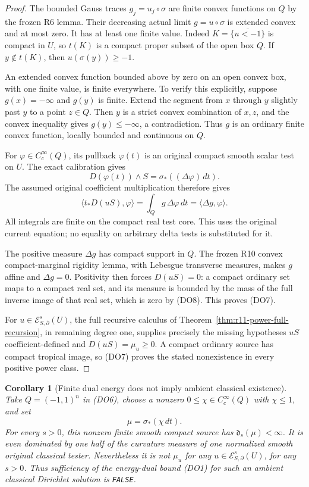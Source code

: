 \documentclass[11pt,a4paper]{article}
\numberwithin{equation}{section}
\newtheorem{corollary}[theorem]{Corollary}
\theoremstyle{definition}
\theoremstyle{remark}
\begin{document}
\begin{proof}
The bounded Gauss traces $g_j=u_j\circ\sigma$ are finite convex
functions on $Q$ by the frozen R6 lemma. Their decreasing actual
limit $g=u\circ\sigma$ is extended convex and at most zero.
It has at least one finite value. Indeed
$K=\overline{\{u<-1\}}$ is compact in $U$, so $t(K)$ is
a compact proper subset of the open box $Q$. If $y\notin t(K)$,
then $u(\sigma(y))\geq-1$.

An extended convex function bounded above by zero on an open
convex box, with one finite value, is finite everywhere. To
verify this explicitly, suppose $g(x)=-\infty$ and $g(y)$ is
finite. Extend the segment from $x$ through $y$ slightly past
$y$ to a point $z\in Q$. Then $y$ is a strict convex
combination of $x,z$, and the convex inequality gives
$g(y)\leq-\infty$, a contradiction. Thus $g$ is an ordinary
finite convex function, locally bounded and continuous on $Q$.

For $\varphi\in C_c^\infty(Q)$, its pullback $\varphi(t)$
is an original compact smooth scalar test on $U$. The exact
calibration gives
\[
              D(\varphi(t))\wedge S
                         =\sigma_*((\Delta\varphi)\,dt).
\]
The assumed original coefficient multiplication therefore gives
\[
 \bigl\langle t_*D(uS),\varphi\bigr\rangle
      =\int_Q g\,\Delta\varphi\,dt
      =\langle\Delta g,\varphi\rangle.
 \tag{DO8}
\]
All integrals are finite on the compact real test core. This
uses the original current equation; no equality on arbitrary
delta tests is substituted for it.

The positive measure $\Delta g$ has compact support in $Q$.
The frozen R10 convex compact-marginal rigidity lemma, with
Lebesgue transverse measures, makes $g$ affine and
$\Delta g=0$. Positivity then forces $D(uS)=0$: a compact
ordinary set maps to a compact real set, and its measure is
bounded by the mass of the full inverse image of that real set,
which is zero by (DO8). This proves (DO7).

For $u\in\mathcal E^s_{S,\partial}(U)$, the full recursive
calculus of Theorem~\ref{thm:r11-power-full-recursion}, in
remaining degree one, supplies precisely the missing hypotheses
$uS$ coefficient-defined and $D(uS)=\mu_u\geq0$.
A compact ordinary source has compact tropical image, so (DO7)
proves the stated nonexistence in every positive power class.
\end{proof}

\begin{corollary}[Finite dual energy does not imply ambient classical existence]
\label{cor:r11-dual-energy-insufficient}
Take $Q=(-1,1)^n$ in (DO6), choose a nonzero
$0\leq\chi\in C_c^\infty(Q)$ with $\chi\leq1$, and set
\[
                       \mu=\sigma_*(\chi\,dt).
 \tag{DO9}
\]
For every $s>0$, this nonzero finite smooth compact source has
$\mathfrak d_s(\mu)<\infty$. It is even dominated by one half
of the curvature measure of one normalized smooth original
classical tester. Nevertheless it is not $\mu_u$ for any
$u\in\mathcal E^s_{S,\partial}(U)$, for any $s>0$.
Thus sufficiency of the energy-dual bound (DO1) for such an
ambient classical Dirichlet solution is \texttt{FALSE}.
\end{corollary}
\end{document}
